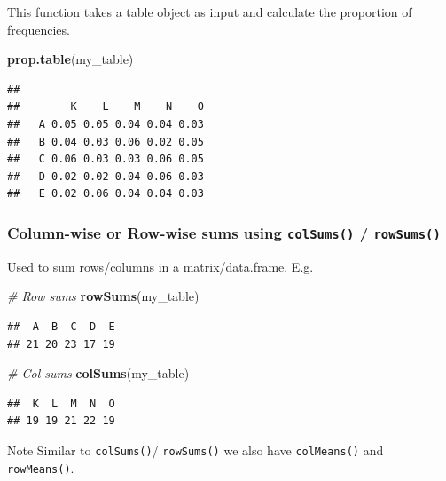 \documentclass[
]{book}
\newenvironment{Shaded}{\begin{snugshade}}{\end{snugshade}}
\newcommand{\CommentTok}[1]{\textcolor[rgb]{0.56,0.35,0.01}{\textit{#1}}}
\newcommand{\FunctionTok}[1]{\textcolor[rgb]{0.13,0.29,0.53}{\textbf{#1}}}
\newcommand{\NormalTok}[1]{#1}
\begin{document}
This function takes a table object as input and calculate the proportion of frequencies.

\begin{Shaded}
\begin{Highlighting}[]
\FunctionTok{prop.table}\NormalTok{(my\_table)}
\end{Highlighting}
\end{Shaded}

\begin{verbatim}
##    
##        K    L    M    N    O
##   A 0.05 0.05 0.04 0.04 0.03
##   B 0.04 0.03 0.06 0.02 0.05
##   C 0.06 0.03 0.03 0.06 0.05
##   D 0.02 0.02 0.04 0.06 0.03
##   E 0.02 0.06 0.04 0.04 0.03
\end{verbatim}

\hypertarget{column-wise-or-row-wise-sums-using-colsums-rowsums}{%
\subsubsection*{\texorpdfstring{Column-wise or Row-wise sums using \texttt{colSums()} / \texttt{rowSums()}}{Column-wise or Row-wise sums using colSums() / rowSums()}}\label{column-wise-or-row-wise-sums-using-colsums-rowsums}}

Used to sum rows/columns in a matrix/data.frame. E.g.

\begin{Shaded}
\begin{Highlighting}[]
\CommentTok{\# Row sums}
\FunctionTok{rowSums}\NormalTok{(my\_table)}
\end{Highlighting}
\end{Shaded}

\begin{verbatim}
##  A  B  C  D  E 
## 21 20 23 17 19
\end{verbatim}

\begin{Shaded}
\begin{Highlighting}[]
\CommentTok{\# Col sums}
\FunctionTok{colSums}\NormalTok{(my\_table)}
\end{Highlighting}
\end{Shaded}

\begin{verbatim}
##  K  L  M  N  O 
## 19 19 21 22 19
\end{verbatim}

Note Similar to \texttt{colSums()}/ \texttt{rowSums()} we also have \texttt{colMeans()} and \texttt{rowMeans()}.
\end{document}
